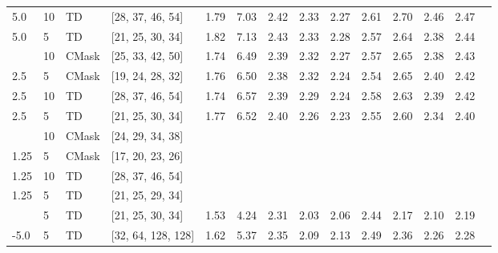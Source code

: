 \begin{tabular}{llllrrrrrrrrrr}
5.0 & 10 & TD & [28, 37, 46, 54] & 1.79 & 7.03 & 2.42 & \cellcolor{green!20}2.33 & 2.27 & \cellcolor{green!20}2.61 & \cellcolor{green!20}2.70 & \cellcolor{green!20}2.46 & \cellcolor{green!50}2.47 \\
5.0 & 5 & TD & [21, 25, 30, 34] & \cellcolor{green!20}1.82 & \cellcolor{green!20}7.13 & \cellcolor{green!20}2.43 & 2.33 & \cellcolor{green!20}2.28 & 2.57 & 2.64 & 2.38 & 2.44 \\
\hdashline
\midrule
2.5 & 10 & CMask & [25, 33, 42, 50] & 1.74 & 6.49 & \cellcolor{green!20}2.39 & \cellcolor{green!20}2.32 & \cellcolor{green!20}2.27 & \cellcolor{green!20}2.57 & \cellcolor{green!20}2.65 & 2.38 & \cellcolor{green!50}2.43 \\
2.5 & 5 & CMask & [19, 24, 28, 32] & \cellcolor{green!20}1.76 & \cellcolor{green!20}6.50 & 2.38 & 2.32 & 2.24 & 2.54 & 2.65 & \cellcolor{green!20}2.40 & 2.42 \\
2.5 & 10 & TD & [28, 37, 46, 54] & 1.74 & \cellcolor{green!20}6.57 & 2.39 & \cellcolor{green!20}2.29 & \cellcolor{green!20}2.24 & \cellcolor{green!20}2.58 & \cellcolor{green!20}2.63 & \cellcolor{green!20}2.39 & \cellcolor{green!50}2.42 \\
2.5 & 5 & TD & [21, 25, 30, 34] & \cellcolor{green!20}1.77 & 6.52 & \cellcolor{green!20}2.40 & 2.26 & 2.23 & 2.55 & 2.60 & 2.34 & 2.40 \\
\hdashline
\midrule
1.25 & 10 & CMask & [24, 29, 34, 38] &  &  &  &  &  &  &  &  &  \\
1.25 & 5 & CMask & [17, 20, 23, 26] &  &  &  &  &  &  &  &  &  \\
1.25 & 10 & TD & [28, 37, 46, 54] &  &  &  &  &  &  &  &  &  \\
1.25 & 5 & TD & [21, 25, 29, 34] &  &  &  &  &  &  &  &  &  \\
\hdashline
\midrule
-5.0 & 5 & TD & [21, 25, 30, 34] & 1.53 & 4.24 & 2.31 & 2.03 & 2.06 & 2.44 & 2.17 & 2.10 & 2.19 \\
-5.0 & 5 & TD & [32, 64, 128, 128] & \cellcolor{green!20}1.62 & \cellcolor{green!20}5.37 & \cellcolor{green!20}2.35 & \cellcolor{green!20}2.09 & \cellcolor{green!20}2.13 & \cellcolor{green!20}2.49 & \cellcolor{green!20}2.36 & \cellcolor{green!20}2.26 & \cellcolor{green!50}2.28 \\
\bottomrule
\end{tabular}